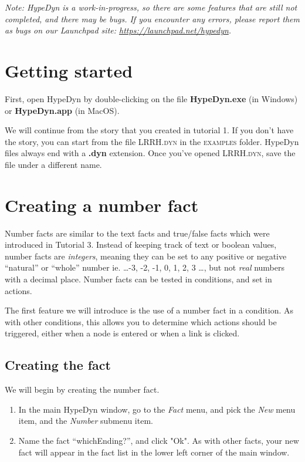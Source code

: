 \documentclass{article}
\begin{document}
\textit{Note:  HypeDyn is a work-in-progress, so there are some features that are still
not completed, and there may be bugs. If you encounter any errors, please
report them as bugs on our Launchpad site: \url{https://launchpad.net/hypedyn}.}

\section{Getting started}

First, open HypeDyn by double-clicking on the file \textbf{HypeDyn.exe} (in
Windows) or \textbf{HypeDyn.app} (in MacOS).

We will continue from the story that you created in tutorial 1. If you don't
have the story, you can start from the file \textsc{LRRH.dyn} in the
\textsc{examples} folder. HypeDyn files always end with a \textbf{.dyn} extension.
Once you've opened \textsc{LRRH.dyn}, save the file under a different name.

\section{Creating a number fact}

Number facts are similar to the text facts and true/false facts which 
were introduced in Tutorial 3. Instead of keeping track of text or 
boolean values, number facts are \textit{integers}, meaning they can be set 
to any positive or negative ``natural'' or ``whole'' number ie. \dots -3, 
-2, -1, 0, 1, 2, 3 \dots, but not \textit{real} numbers with a 
decimal place. Number facts can be tested in conditions, and set in 
actions.

The first feature we will introduce is the use of a number fact in a condition.
As with other conditions, this allows you to determine which actions should be
triggered, either when a node is entered or when a link is clicked.

\subsection{Creating the fact}

We will begin by creating the number fact.

\begin{enumerate}
  \item In the main HypeDyn window, go to the \textit{Fact} menu, and 
  pick the \textit{New} menu item, and the \textit{Number} submenu item. 
  \item Name the fact ``whichEnding?'', and click "Ok". As with other 
  facts, your new fact will appear in the fact list in the lower left 
  corner of the main window.  
\end{enumerate}
\end{document}
